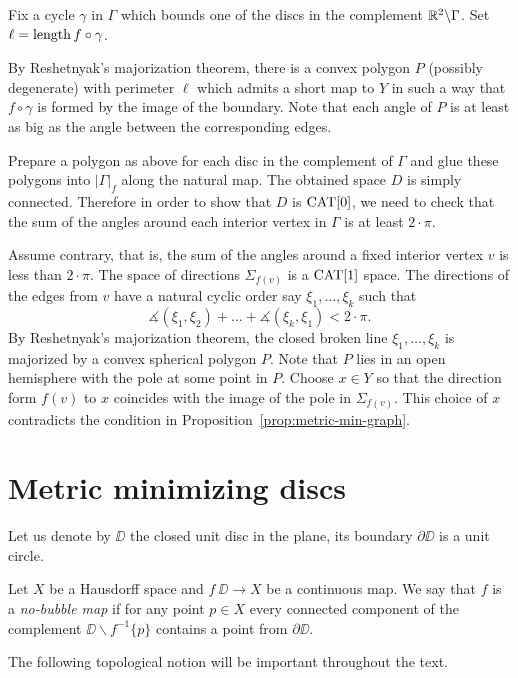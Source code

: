\documentclass[a4paper,10pt]{amsart}
\begin{document}
Fix a cycle $\gamma$ in $\Gamma$ which bounds one of the discs in the complement $\mathbb{R}^2\backslash \Gamma$.
Set $\ell=\mathop{\rm length}\nolimits f\circ\gamma$.

By Reshetnyak's majorization theorem, there is a convex polygon $P$ (possibly degenerate) with perimeter $\ell$ which admits 
a short map to $Y$ in such a way that $f\circ\gamma$ is formed by the image of the boundary.
Note that each angle of $P$ is at least as big as 
the angle between the corresponding edges.

Prepare a polygon as above for each disc in the complement of $\Gamma$
and glue these polygons into $|\Gamma|_f$ along the natural map.
The obtained space $D$ is simply connected.
Therefore in order to show that $D$ is $\mathop{\rm CAT}\nolimits[0]$,
we need to check that the sum of the angles around each interior vertex in $\Gamma$ is at least $2\cdot\pi$.


Assume contrary, that is, 
the sum of the angles around a fixed interior vertex $v$ is less than $2\cdot\pi$.
The space of directions $\Sigma_{f(v)}$ is a $\mathop{\rm CAT}\nolimits[1]$ space.
The directions of the edges from $v$ have a natural
cyclic order say $\xi_1,\dots,\xi_k$
such that
\[\measuredangle(\xi_1,\xi_2)+\dots+\measuredangle(\xi_k,\xi_1)<2\cdot\pi.\]
By Reshetnyak's majorization theorem,
the closed broken line $\xi_1,\dots,\xi_k$ is majorized by a convex spherical polygon $P$.
Note that $P$ lies in an open hemisphere with the pole  at some point in $P$.
Choose $x\in Y$ so that the direction form $f(v)$ to $x$ coincides with the image of the pole in $\Sigma_{f(v)}$.
This choice of $x$ contradicts the condition in Proposition~\ref{prop:metric-min-graph}.\qeds







\section{Metric minimizing discs}



Let us denote by $\DD$ the closed unit disc in the plane,
its boundary $\partial \DD$ is a unit circle.

Let $X$ be a Hausdorff space and
$f\:\DD\to X$ be a continuous map.
We say that $f$ is a \emph{no-bubble map}
if for any point $p\in X$ every connected component of the complement $\DD\backslash f^{-1}\{p\}$ contains a point from $\partial \DD$.

The following topological notion will be important throughout the text.
\end{document}

